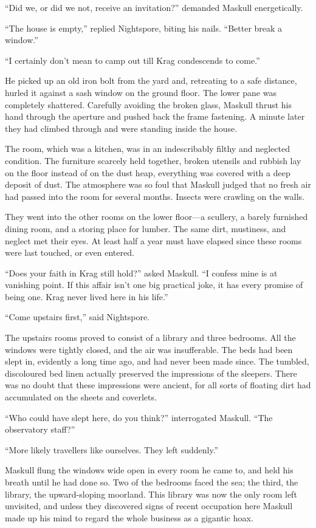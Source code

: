 ``Did we, or did we not, receive an invitation?'' demanded Maskull energetically.

``The house is empty,'' replied Nightspore, biting his nails. ``Better break a window.''

``I certainly don't mean to camp out till Krag condescends to come.''

He picked up an old iron bolt from the yard and, retreating to a safe distance, hurled it against a sash window on the ground floor. The lower pane was completely shattered. Carefully avoiding the broken glass, Maskull thrust his hand through the aperture and pushed back the frame fastening. A minute later they had climbed through and were standing inside the house.

The room, which was a kitchen, was in an indescribably filthy and neglected condition. The furniture scarcely held together, broken utensils and rubbish lay on the floor instead of on the dust heap, everything was covered with a deep deposit of dust. The atmosphere was so foul that Maskull judged that no fresh air had passed into the room for several months. Insects were crawling on the walls.

They went into the other rooms on the lower floor—a scullery, a barely furnished dining room, and a storing place for lumber. The same dirt, mustiness, and neglect met their eyes. At least half a year must have elapsed since these rooms were last touched, or even entered.

``Does your faith in Krag still hold?'' asked Maskull. ``I confess mine is at vanishing point. If this affair isn't one big practical joke, it has every promise of being one. Krag never lived here in his life.''

``Come upstairs first,'' said Nightspore.

The upstairs rooms proved to consist of a library and three bedrooms. All the windows were tightly closed, and the air was insufferable. The beds had been slept in, evidently a long time ago, and had never been made since. The tumbled, discoloured bed linen actually preserved the impressions of the sleepers. There was no doubt that these impressions were ancient, for all sorts of floating dirt had accumulated on the sheets and coverlets.

``Who could have slept here, do you think?'' interrogated Maskull. ``The observatory staff?''

``More likely travellers like ourselves. They left suddenly.''

Maskull flung the windows wide open in every room he came to, and held his breath until he had done so. Two of the bedrooms faced the sea; the third, the library, the upward-sloping moorland. This library was now the only room left unvisited, and unless they discovered signs of recent occupation here Maskull made up his mind to regard the whole business as a gigantic hoax.

